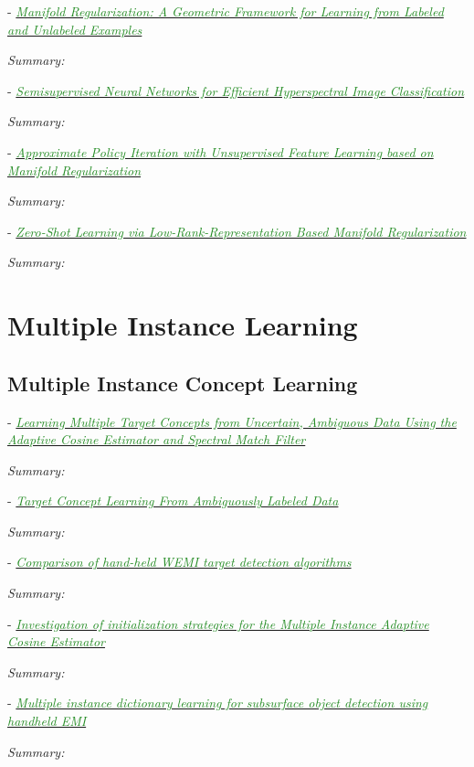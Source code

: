 \documentclass[]{article}
\newcommand{\paperentry}[4]{
            \hangindent=1cm
            \cite{#1} - \href{run:../References/#3}{\textcolor{ForestGreen}{\textit{#2}}}
            
            \noindent            
            \begin{minipage}[t]{0.1\linewidth}\hfill\end{minipage}
            \begin{minipage}[t]{0.8\linewidth}\textcolor{NavyBlue}{{\textit{Summary:}}}#4\end{minipage}
            \vspace{.25cm}
          }
\begin{document}
	\paperentry{Belkin2006ManReg}
	{Manifold Regularization: A Geometric Framework for Learning from Labeled and Unlabeled Examples}
	{Manifold_Representation_Learning/ManifoldRegularization/Belkin2006ManReg.pdf}
	{}
	
	\paperentry{Ratle2010ManRegHSI}
	{Semisupervised Neural Networks for Efficient Hyperspectral Image Classification}
	{Manifold_Representation_Learning/ManifoldRegularization/Ratle2010ManRegHSI.pdf}
	{}
	
	\paperentry{Li2015ManRegReinforcementLearning}
	{Approximate Policy Iteration with Unsupervised Feature Learning based on Manifold Regularization}
	{Manifold_Representation_Learning/ManifoldRegularization/Li2015ManRegReinforcementLearning.pdf}
	{}
	
	\paperentry{Meng2018ManRegZeroShot}
	{Zero-Shot Learning via Low-Rank-Representation Based Manifold Regularization}
	{Manifold_Representation_Learning/ManifoldRegularization/Meng2018ManRegZeroShot.pdf}
	{}
	
\section{Multiple Instance Learning}

	\subsection{Multiple Instance Concept Learning}
	
		\paperentry{Bocinsky2019Thesis}
		{Learning Multiple Target Concepts from Uncertain, Ambiguous Data Using the Adaptive Cosine Estimator and Spectral Match Filter}
		{Multiple_Instance_Learning/Bocinsky2019Thesis.pdf}
		{}
		
		\paperentry{Jiao2017Thesis}
		{Target Concept Learning From Ambiguously Labeled Data}
		{Multiple_Instance_Learning/Jiao2017MIHE_Thesis.pdf}
		{}
		
		\paperentry{Mccurley2019SPIEWEMIComparison}
		{Comparison of hand-held WEMI target detection algorithms}
		{Multiple_Instance_Learning/Mccurley2019SPIEWEMIComparison.pdf}
		{}
		
		\paperentry{Bocinsky2019SPIEMIACEInitialization}
		{Investigation of initialization strategies for the Multiple Instance Adaptive Cosine Estimator}
		{Multiple_Instance_Learning/Bocinsky2019SPIEMIACEInitialization.pdf}
		{}
		
		\paperentry{Zare2015MILLandmineEMI}
		{Multiple instance dictionary learning for subsurface object detection using handheld EMI}
		{Multiple_Instance_Learning/Zare2015MILLandmineEMI.pdf}
		{}
		
\end{document}
